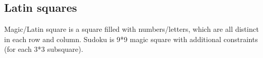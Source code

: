 \subsection{Latin squares}

Magic/Latin square is a square filled with numbers/letters, which are all distinct in each row and column.
Sudoku is 9*9 magic square with additional constraints (for each 3*3 subsquare).



